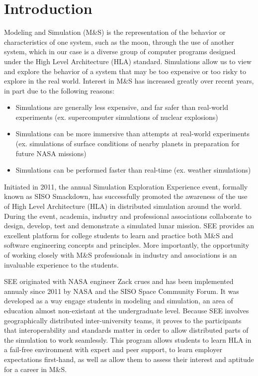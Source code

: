 \documentclass[journal, onecolumn]{IEEEtran}
\begin{document}
%
\IEEEpeerreviewmaketitle

\section{Introduction}
Modeling and Simulation (M\&S) is the representation of the behavior or characteristics of one system, such as the moon, through the use of another system, which in our case is a diverse group of computer programs designed under the High Level Architecture (HLA) standard. Simulations allow us to view and explore the behavior of a system that may be too expensive or too risky to explore in the real world. Interest in M\&S has increased greatly over recent years, in part due to the following reasons:
\begin{itemize}
	\item Simulations are generally less expensive, and far safer than real-world experiments (ex. supercomputer simulations of nuclear explosions)
	\item Simulations can be more immersive than attempts at real-world experiments (ex. simulations of surface conditions of nearby planets in 
		preparation for future NASA missions)
	\item Simulations can be performed faster than real-time (ex. weather simulations)
\end{itemize}


Initiated in 2011, the annual Simulation Exploration Experience event, formally known as SISO Smackdown, has successfully promoted the awareness of the use of High Level Architecture (HLA) in distributed simulation around the world. During the event, academia, industry and professional associations collaborate to design, develop, test and demonstrate a simulated lunar mission. SEE provides an excellent platform for college students to learn and practice both M\&S and software engineering concepts and principles. More importantly, the opportunity of working closely with M\&S professionals in industry and associations is an invaluable experience to the students. 

SEE originated with NASA engineer Zack crues and has been implemented annualy since 2011 by NASA and the SISO Space Community Forum.  It was developed as a way engage students in modeling and simulation, an area of education almost non-existant at the undergraduate level.  Because SEE involves geographically distributed inter-university teams, it proves to the participants that interoperability and standards matter in order to allow distributed parts of the simulation to work seamlessly. This program allows students to learn HLA in a fail-free environment with expert and peer support, to learn employer expectations first-hand, as well as allow them to assess their interest and aptitude for a career in M\&S.  
\end{document}
